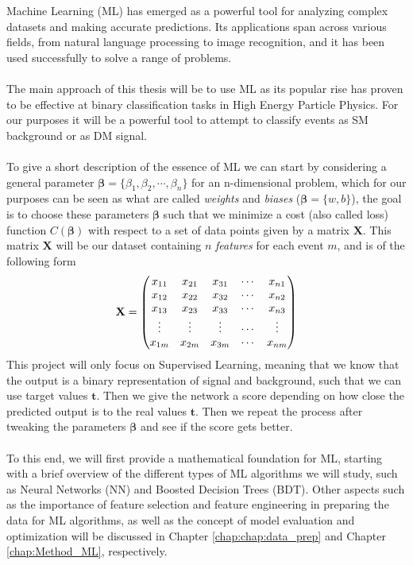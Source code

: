 \documentclass[12pt, a4paper]{book}
\begin{document}
Machine Learning (ML) has emerged as a powerful tool for analyzing complex datasets and making accurate predictions. Its applications span across various fields, from natural language processing to image recognition, and it has been used successfully to solve a range of problems. \\
\\The main approach of this thesis will be to use ML as its popular rise has proven to be effective at binary classification tasks \cite{Baldi_2016, DeepLearing} in High Energy Particle Physics. 
For our purposes it will be a powerful tool to attempt to classify events as SM background or as DM signal.\\
\\To give a short description of the essence of ML we can start by considering a general parameter $\bm{\beta} = \{\beta_1,\beta_2,\cdots,\beta_n\}$ for an n-dimensional problem, which for our purposes can be seen as what are called \textit{weights} and \textit{biases} 
($\bm \beta = \{w, b\}$), 
the goal is to choose these parameters $\bm{\beta}$ such that we minimize a cost (also called loss) function $C(\bm{\beta})$ with respect to a set of data points given by a matrix $\mathbf{X}$. This matrix $\mathbf{X}$ will be 
our dataset containing $n$ \textit{features} for each event $m$, and is of the following form 
\begin{equation}\label{eq:dataset}
    \bf X = \begin{pmatrix}
        x_{11} & x_{21} & x_{31} & \cdots & x_{n1}\\
        x_{12} & x_{22} & x_{32} & \cdots & x_{n2}\\
        x_{13} & x_{23} & x_{33} & \cdots & x_{n3}\\
        \vdots & \vdots & \vdots & \cdots & \vdots\\
        x_{1m} & x_{2m} & x_{3m} & \cdots & x_{nm}\\  
    \end{pmatrix}    
\end{equation}
This project will only focus on Supervised Learning, meaning that we know that the output is a binary representation of signal and background, such that we can use target values $\bm{t}$. 
Then we give the network a score depending on how close the predicted output is to the real values $\bm t $. Then we repeat the process after tweaking the parameters $\bm \beta $ and see if the score gets better.\\
\\To this end, we will first provide a mathematical foundation for ML, starting with a brief overview of the different types of ML algorithms we will study, such as Neural Networks (NN) and Boosted Decision Trees (BDT). 
Other aspects such as the importance of feature selection and feature engineering in preparing the data for ML algorithms, as well as the concept of model evaluation and optimization will be discussed in Chapter \ref{chap:chap:data_prep} and Chapter \ref{chap:Method_ML}, respectively.
\end{document}
